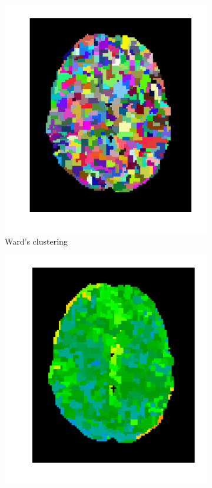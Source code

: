 \documentclass{frontiersSCNS} %
\begin{document}
\begin{figure}[hbtp]
\begin{center}
\begin{subfigure}[b]{.23\linewidth}
        \includegraphics[width=\linewidth]{img/clustering/ward}
        \caption{Ward's clustering}
      \end{subfigure}
      \begin{subfigure}[b]{.23\linewidth}
        \includegraphics[width=\linewidth]{img/clustering/ward_compressed}

\end{subfigure}
\end{center}
\end{figure}
\end{document}
